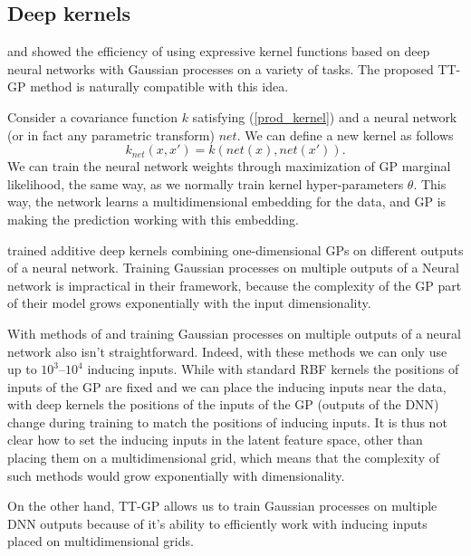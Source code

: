 \subsection{Deep kernels}

  \citet{wilson2016stochastic} and \citet{wilson2016deep} showed the efficiency
  of using expressive kernel functions based on deep neural networks with
  Gaussian processes on a variety of tasks. The proposed TT-GP method is
  naturally compatible with this idea.

  Consider a covariance function $k$ satisfying (\ref{prod_kernel}) and
  a neural network (or in fact any parametric transform) $net$. We can define a
  new kernel as follows
  \[
    k_{net}(x, x') = k(net(x), net(x')).
  \]
  We can train the neural network weights through maximization of GP marginal
  likelihood, the same way, as we normally train kernel hyper-parameters $\theta$.
  This way, the network learns a multidimensional embedding for the data, and
  GP is making the prediction working with this embedding.
  
  \citet{wilson2016stochastic} trained additive deep kernels combining 
  one-dimensional GPs on different outputs of a neural network. Training
  Gaussian processes on multiple outputs of a Neural network is impractical
  in their framework, because the complexity of the GP part of their model
  grows exponentially with the input dimensionality. 

  With methods of \citet{hensman2013} and \citet{hensman2015} training Gaussian
  processes on multiple outputs of a neural network also isn't straightforward. Indeed,
  with these methods we can only use up to $10^3$--$10^4$ inducing inputs. While
  with standard RBF kernels the positions of inputs of the GP are fixed and we can place 
  the inducing inputs near the data, with deep kernels the positions of the
  inputs of the GP (outputs of the DNN) change during training to match the positions of inducing inputs.
  It is thus not clear how to set the inducing inputs in the latent feature space, other
  than placing them on a multidimensional grid, which means that the complexity
  of such methods would grow exponentially with dimensionality.

  On the other hand, TT-GP allows us to train Gaussian processes on multiple DNN
  outputs because of it's ability to efficiently work with inducing inputs 
  placed on multidimensional grids.
